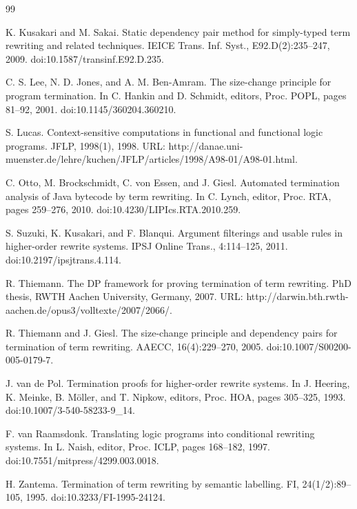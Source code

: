 \documentclass[10pt,a4paper]{amsart}
\begin{document}
\begin{thebibliography}{99}
\par\noindent  [36]  K. Kusakari and M. Sakai.  Static dependency pair method for simply-typed term rewriting and related techniques.  IEICE Trans. Inf. Syst., E92.D(2):235–247, 2009.  doi:10.1587/transinf.E92.D.235.  
 
\par\noindent  [37]  C. S. Lee, N. D. Jones, and A. M. Ben-Amram.  The size-change principle for program termination.  In C. Hankin and D. Schmidt, editors, Proc. POPL, pages 81–92, 2001.  doi:10.1145/360204.360210.  
 
\par\noindent  [38]  S. Lucas.  Context-sensitive computations in functional and functional logic programs.  JFLP, 1998(1), 1998.  URL: http://danae.uni-muenster.de/lehre/kuchen/JFLP/articles/1998/A98-01/A98-01.html.  
 
\par\noindent  [39]  C. Otto, M. Brockschmidt, C. von Essen, and J. Giesl.  Automated termination analysis of Java bytecode by term rewriting.  In C. Lynch, editor, Proc. RTA, pages 259–276, 2010.  doi:10.4230/LIPIcs.RTA.2010.259.  
 
\par\noindent  [40]  S. Suzuki, K. Kusakari, and F. Blanqui.  Argument filterings and usable rules in higher-order rewrite systems.  IPSJ Online Trans., 4:114–125, 2011.  doi:10.2197/ipsjtrans.4.114.  
 
\par\noindent  [41]  R. Thiemann.  The DP framework for proving termination of term rewriting.  PhD thesis, RWTH Aachen University, Germany, 2007.  URL: http://darwin.bth.rwth-aachen.de/opus3/volltexte/2007/2066/.  
 
\par\noindent  [42]  R. Thiemann and J. Giesl.  The size-change principle and dependency pairs for termination of term rewriting.  AAECC, 16(4):229–270, 2005.  doi:10.1007/S00200-005-0179-7.  
 
\par\noindent  [43]  J. van de Pol.  Termination proofs for higher-order rewrite systems.  In J. Heering, K. Meinke, B. Möller, and T. Nipkow, editors, Proc. HOA, pages 305–325, 1993.  doi:10.1007/3-540-58233-9\_14.  
 
\par\noindent  [44]  F. van Raamsdonk.  Translating logic programs into conditional rewriting systems.  In L. Naish, editor, Proc. ICLP, pages 168–182, 1997.  doi:10.7551/mitpress/4299.003.0018.  
 
\par\noindent  [45]  H. Zantema.  Termination of term rewriting by semantic labelling.  FI, 24(1/2):89–105, 1995.  doi:10.3233/FI-1995-24124.  
  
\end{thebibliography}
\end{document}
